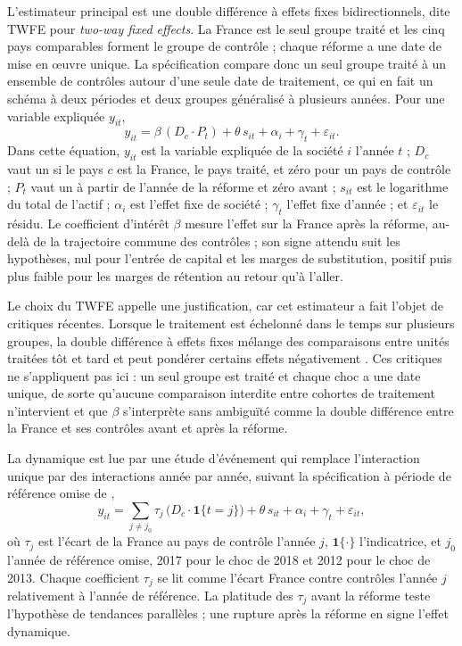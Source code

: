 L'estimateur principal est une double différence à effets fixes bidirectionnels, dite TWFE pour
\textit{two-way fixed effects}. La France est le seul groupe traité et les cinq pays comparables forment le
groupe de contrôle ; chaque réforme a une date de mise en \oe uvre unique. La spécification compare
donc un seul groupe traité à un ensemble de contrôles autour d'une seule date de traitement, ce qui
en fait un schéma à deux périodes et deux groupes généralisé à plusieurs années. Pour une variable
expliquée $y_{it}$,
\begin{equation}\label{eq:did}
  y_{it} = \beta \, (D_c \cdot P_t) + \theta \, s_{it} + \alpha_i + \gamma_t + \varepsilon_{it}.
\end{equation}
Dans cette équation, $y_{it}$ est la variable expliquée de la société $i$ l'année $t$ ; $D_c$ vaut
un si le pays $c$ est la France, le pays traité, et zéro pour un pays de contrôle ; $P_t$ vaut un à
partir de l'année de la réforme et zéro avant ; $s_{it}$ est le logarithme du total de l'actif ;
$\alpha_i$ est l'effet fixe de société ; $\gamma_t$ l'effet fixe d'année ; et $\varepsilon_{it}$ le
résidu. Le coefficient d'intérêt $\beta$ mesure l'effet sur la France après la réforme, au-delà de
la trajectoire commune des contrôles ; son signe attendu suit les hypothèses, nul pour l'entrée de
capital et les marges de substitution, positif puis plus faible pour les marges de rétention au
retour qu'à l'aller.

Le choix du TWFE appelle une justification, car cet estimateur a fait l'objet de critiques récentes.
Lorsque le traitement est échelonné dans le temps sur plusieurs groupes, la double différence à
effets fixes mélange des comparaisons entre unités traitées tôt et tard et peut pondérer certains
effets négativement \citep{dechaisemartin2020,goodmanbacon2021}. Ces critiques ne s'appliquent pas
ici : un seul groupe est traité et chaque choc a une date unique, de sorte qu'aucune comparaison
interdite entre cohortes de traitement n'intervient et que $\beta$ s'interprète sans ambiguïté comme
la double différence entre la France et ses contrôles avant et après la réforme.

La dynamique est lue par une étude d'événement qui remplace l'interaction unique par des
interactions année par année, suivant la spécification à période de référence omise de
\citet{sunabraham2021},
\begin{equation}\label{eq:event}
  y_{it} = \sum_{j \neq j_0} \tau_j \, \bigl(D_c \cdot \mathbf{1}\{t = j\}\bigr)
           + \theta \, s_{it} + \alpha_i + \gamma_t + \varepsilon_{it},
\end{equation}
où $\tau_j$ est l'écart de la France au pays de contrôle l'année $j$, $\mathbf{1}\{\cdot\}$
l'indicatrice, et $j_0$ l'année de référence omise, 2017 pour le choc de 2018 et 2012 pour le choc
de 2013. Chaque coefficient $\tau_j$ se lit comme l'écart France contre contrôles l'année $j$
relativement à l'année de référence. La platitude des $\tau_j$ avant la réforme teste l'hypothèse de
tendances parallèles ; une rupture après la réforme en signe l'effet dynamique.

